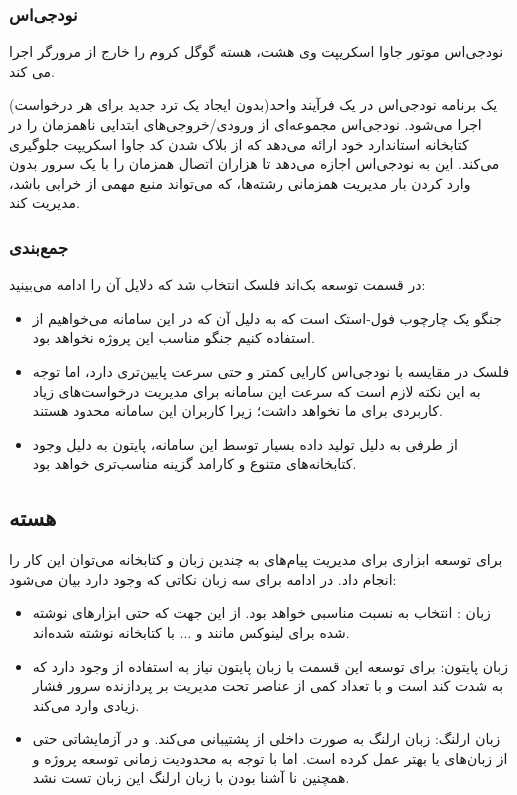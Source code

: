 \subsubsection{نودجی‌اس}
نودجی‌اس موتور جاوا اسکریپت وی هشت، هسته گوگل کروم را خارج از مرورگر اجرا می کند.

یک برنامه نودجی‌اس در یک فرآیند واحد(بدون ایجاد یک ترد جدید برای هر درخواست) اجرا می‌شود. نودجی‌اس مجموعه‌ای از ورودی/خروجی‌های ابتدایی ناهمزمان را در کتابخانه استاندارد خود ارائه می‌دهد که از بلاک شدن کد جاوا اسکریپت جلوگیری می‌کند. این به نودجی‌اس اجازه می‌دهد تا هزاران اتصال همزمان را با یک سرور بدون وارد کردن بار مدیریت همزمانی رشته‌ها، که می‌تواند منبع مهمی از خرابی باشد، مدیریت کند.

\subsubsection{جمع‌بندی}
در قسمت توسعه بک‌اند فلسک انتخاب شد که دلایل آن را ادامه می‌بینید:
\begin{itemize}
    \item جنگو یک چارچوب فول-استک است که به دلیل آن که در این سامانه می‌خواهیم از  استفاده کنیم جنگو مناسب این پروژه نخواهد بود.
    \item فلسک در مقایسه با نودجی‌اس کارایی کمتر و حتی سرعت پایین‌تری دارد، اما توجه به این نکته لازم است که سرعت این سامانه برای مدیریت درخواست‌های زیاد کاربردی برای ما نخواهد داشت؛ زیرا کاربران این سامانه محدود هستند.
    \item از طرفی به دلیل تولید داده بسیار توسط این سامانه، پایتون به دلیل وجود کتابخانه‌های متنوع و کارامد گزینه مناسب‌تری خواهد بود. 
\end{itemize}


\subsection{هسته }
برای توسعه ابزاری برای مدیریت پیام‌های  به چندین زبان و کتابخانه می‌توان این کار را انجام داد. در ادامه برای سه زبان نکاتی که وجود دارد بیان می‌شود:

\begin{itemize}
    \item زبان : انتخاب به نسبت مناسبی خواهد بود. از این جهت که حتی ابزارهای نوشته شده برای لینوکس مانند  و ... با کتابخانه  نوشته شده‌اند.
    \item زبان پایتون: برای توسعه این قسمت با زبان پایتون نیاز به استفاده از  وجود دارد که به شدت کند است و با تعداد کمی از عناصر تحت مدیریت بر پردازنده سرور فشار زیادی وارد می‌کند.
    \item زبان ارلنگ: زبان ارلنگ به صورت داخلی از  پشتیبانی می‌کند. و در آزمایشاتی حتی از زبان‌های  یا  بهتر عمل کرده است. اما با توجه به محدودیت زمانی توسعه پروژه و همچنین نا آشنا بودن با زبان ارلنگ این زبان تست نشد.
\end{itemize}

